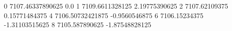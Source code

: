 0 7107.46337890625 0.0
1 7109.6611328125 2.19775390625
2 7107.62109375 0.15771484375
4 7106.50732421875 -0.9560546875
6 7106.15234375 -1.31103515625
8 7105.587890625 -1.87548828125
